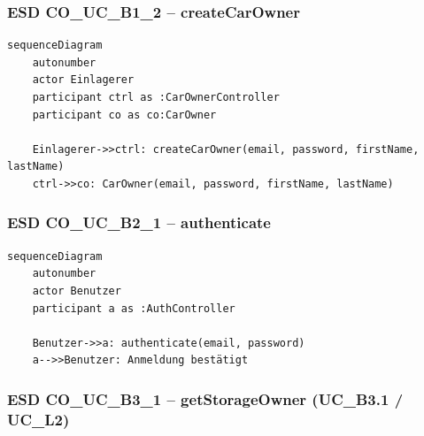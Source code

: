 \newpage

{}
\subsubsection*{ESD CO\_UC\_B1\_2 – createCarOwner}

\begin{lstlisting}[basicstyle=\ttfamily\small, breaklines=true]
sequenceDiagram
    autonumber
    actor Einlagerer
    participant ctrl as :CarOwnerController
    participant co as co:CarOwner

    Einlagerer->>ctrl: createCarOwner(email, password, firstName, lastName)
    ctrl->>co: CarOwner(email, password, firstName, lastName)
\end{lstlisting}

\newpage

{}
\subsubsection*{ESD CO\_UC\_B2\_1 – authenticate}

\begin{lstlisting}[basicstyle=\ttfamily\small, breaklines=true]
sequenceDiagram
    autonumber
    actor Benutzer
    participant a as :AuthController

    Benutzer->>a: authenticate(email, password)
    a-->>Benutzer: Anmeldung bestätigt
\end{lstlisting}

\newpage

{}
\subsubsection*{ESD CO\_UC\_B3\_1 – getStorageOwner (UC\_B3.1 / UC\_L2)}

